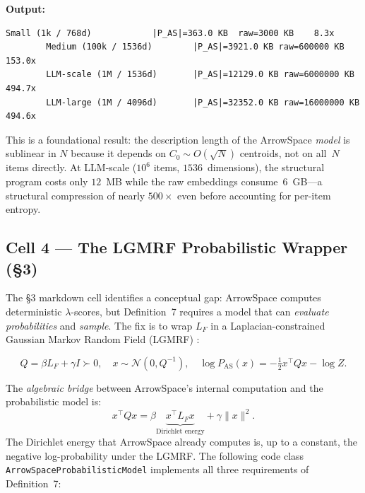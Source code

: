 \documentclass[12pt,a4paper]{article}
\theoremstyle{plain}
\theoremstyle{definition}
\theoremstyle{remark}
\newcommand{\1}{\mathbf{1}}
\begin{document}
	\noindent\textbf{Output:}
	\begin{lstlisting}[numbers=none, backgroundcolor=\color{white},
		frame=none]
		Small (1k / 768d)            |P_AS|=363.0 KB  raw=3000 KB    8.3x
		Medium (100k / 1536d)        |P_AS|=3921.0 KB raw=600000 KB  153.0x
		LLM-scale (1M / 1536d)       |P_AS|=12129.0 KB raw=6000000 KB 494.7x
		LLM-large (1M / 4096d)       |P_AS|=32352.0 KB raw=16000000 KB 494.6x
	\end{lstlisting}
	
	This is a foundational result: the description length of the ArrowSpace
	\emph{model} is sublinear in $N$ because it depends on $C_0 \sim
	O(\sqrt{N})$ centroids, not on all~$N$ items directly.
	At LLM-scale ($10^6$ items, $1536$~dimensions), the structural program
	costs only $12$~MB while the raw embeddings consume~$6$~GB---a
	structural compression of nearly $500\times$ even before accounting for
	per-item entropy.
	
	\subsection{Cell 4 --- The LGMRF Probabilistic Wrapper (§3)}
	
	The §3 markdown cell identifies a conceptual gap: ArrowSpace computes
	deterministic $\lambda$-scores, but Definition~7 requires a model that
	can \emph{evaluate probabilities} and \emph{sample}.
	The fix is to wrap $L_F$ in a Laplacian-constrained Gaussian Markov
	Random Field (LGMRF) \citep{DongLaplacianGMRF, YingLaplacianConstraints,
		RueHeldGMRF}:
	
	\begin{equation}
		\label{eq:lgmrf}
		Q = \beta L_F + \gamma I \succ 0,\quad
		x\sim\mathcal{N}(0, Q^{-1}),\quad
		\log P_\mathrm{AS}(x) = -\tfrac{1}{2}x^\top Qx - \log Z.
	\end{equation}
	
	The \emph{algebraic bridge} between ArrowSpace's internal computation
	and the probabilistic model is:
	\[
	x^\top Qx
	= \beta\underbrace{x^\top L_F x}_{\text{Dirichlet energy}}
	+ \gamma\|x\|^2.
	\]
	The Dirichlet energy that ArrowSpace already computes is, up to a
	constant, the negative log-probability under the LGMRF.
	The following code class \texttt{ArrowSpaceProbabilisticModel}
	implements all three requirements of Definition~7:
	
\end{document}
